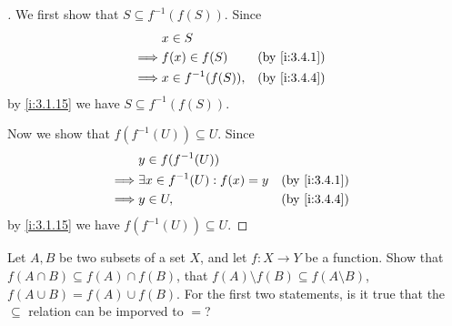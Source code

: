 \begin{proof}[]
  We first show that \(S \subseteq f^{-1}(f(S))\).
  Since
  \begin{align*}
             & x \in S                               \\
    \implies & f(x) \in f(S)       &  & \by{i:3.4.1} \\
    \implies & x \in f^{-1}(f(S)), &  & \by{i:3.4.4}
  \end{align*}
  by \cref{i:3.1.15} we have \(S \subseteq f^{-1}(f(S))\).

  Now we show that \(f(f^{-1}(U)) \subseteq U\).
  Since
  \begin{align*}
             & y \in f(f^{-1}(U))                                   \\
    \implies & \exists x \in f^{-1}(U) : f(x) = y &  & \by{i:3.4.1} \\
    \implies & y \in U,                           &  & \by{i:3.4.4}
  \end{align*}
  by \cref{i:3.1.15} we have \(f(f^{-1}(U)) \subseteq U\).
\end{proof}

\begin{ex}\label{i:ex:3.4.3}
  Let \(A, B\) be two subsets of a set \(X\), and let \(f : X \to Y\) be a function.
  Show that \(f(A \cap B) \subseteq f(A) \cap f(B)\), that \(f(A) \setminus f(B) \subseteq f(A \setminus B)\), \(f(A \cup B) = f(A) \cup f(B)\).
  For the first two statements, is it true that the \(\subseteq\) relation can be imporved to \(=\)?
\end{ex}

